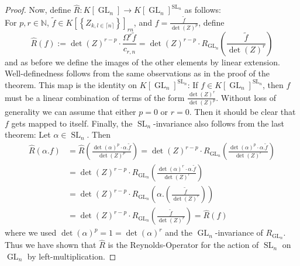\begin{proof}
  Now, define $\hat{R} \colon K \left\lbrack \operatorname{GL}_n \right\rbrack \longrightarrow K \left\lbrack \operatorname{GL}_n \right\rbrack ^{\operatorname{SL}_n} $ as follows: \\
  For $ p,r \in \mathbb{N} $, $ \tilde{f} \in K \left\lbrack \left\lbrace Z_{k,l \in \lceil n \rceil} \right\rbrace \right\rbrack_{rn} $, and $ f = \frac{\tilde{f}}{\operatorname{det} (Z)^p } $, define
  \begin{equation}
    \hat{R} (f) := \operatorname{det} (Z)^{r-p} \cdot \frac{ \Omega^r \tilde{f} }{ c_{r,n} }
    = \operatorname{det} (Z)^{r-p} \cdot R_{\operatorname{GL}_n} \left( \frac{\tilde{f}}{\operatorname{det} (Z) ^r} \right)
  \end{equation}
  and as before we define the images of the other elements by linear extension.
  Well-definedness follows from the same observations as in the proof of the theorem.
  This map is the identity on $ K \left\lbrack \operatorname{GL}_n \right\rbrack ^{\operatorname{SL}_n }$:
  If $f \in K[\operatorname{GL}_n]^{\operatorname{SL}_n}$, then $f$ must be a linear combination of terms of the form $\frac{\operatorname{det}(Z)^r}{\operatorname{det}(Z)^p}$.
  Without loss of generality we can assume that either $p=0$ or $r=0$.
  Then it should be clear that $f$ gets mapped to itself.
  Finally, the $\operatorname{SL}_n$-invariance also follows from the last theorem: Let $\alpha \in \operatorname{SL}_n$.
  Then
  \begin{equation}
    \begin{aligned}
      \hat{R} (\alpha . f)
      &= \hat{R} \left( \frac{ \operatorname{det} (\alpha)^p \cdot \alpha . \tilde{f} }{ \operatorname{det} (Z)^p } \right) 
      = \operatorname{det} (Z)^{r-p} \cdot R_{\operatorname{GL}_n} \left( \frac{ \operatorname{det} (\alpha)^p \cdot \alpha . \tilde{f} }{ \operatorname{det}(Z)^r } \right) \\
      &= \operatorname{det} (Z)^{r-p} \cdot R_{\operatorname{GL}_n} \left( \frac{ \operatorname{det} (\alpha)^r \cdot \alpha . \tilde{f} }{ \operatorname{det}(Z)^r } \right) \\
      &= \operatorname{det} (Z)^{r-p} \cdot R_{\operatorname{GL}_n} \left( \alpha . \left( \frac{ \tilde{f} }{ \operatorname{det} (Z)^r } \right) \right) \\
      &= \operatorname{det} (Z)^{r-p} \cdot R_{\operatorname{GL}_n} \left( \frac{ \tilde{f} }{ \operatorname{det} (Z)^r } \right)
      = \hat{R} (f)
    \end{aligned}
  \end{equation}
  where we used $ \operatorname{det} (\alpha)^p = 1 = \operatorname{det} (\alpha)^r $ and the $\operatorname{GL}_n$-invariance of $R_{\operatorname{GL}_n}$.
  Thus we have shown that $\hat{R}$ is the Reynolds-Operator for the action of $\operatorname{SL}_n$ on $\operatorname{GL}_n$ by left-multiplication.


\end{proof}
